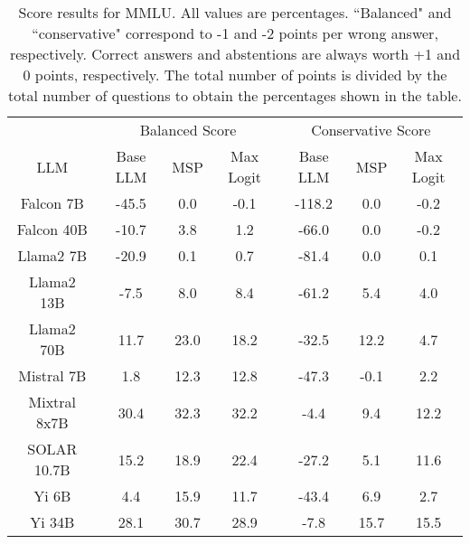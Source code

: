 \begin{table*}
\centering
\begin{tabular}{c|c|c|c|c|c|c}
& \multicolumn{3}{c|}{Balanced Score} & \multicolumn{3}{c}{Conservative Score} \\ 
LLM & Base LLM & MSP & Max Logit & Base LLM & MSP & Max Logit\\ \hline
Falcon 7B & -45.5 & 0.0 & -0.1 & -118.2 & 0.0 & -0.2\\
Falcon 40B & -10.7 & 3.8 & 1.2 & -66.0 & 0.0 & -0.2\\
Llama2 7B & -20.9 & 0.1 & 0.7 & -81.4 & 0.0 & 0.1\\
Llama2 13B & -7.5 & 8.0 & 8.4 & -61.2 & 5.4 & 4.0\\
Llama2 70B & 11.7 & 23.0 & 18.2 & -32.5 & 12.2 & 4.7\\
Mistral 7B & 1.8 & 12.3 & 12.8 & -47.3 & -0.1 & 2.2\\
Mixtral 8x7B & 30.4 & 32.3 & 32.2 & -4.4 & 9.4 & 12.2\\
SOLAR 10.7B & 15.2 & 18.9 & 22.4 & -27.2 & 5.1 & 11.6\\
Yi 6B & 4.4 & 15.9 & 11.7 & -43.4 & 6.9 & 2.7\\
Yi 34B & 28.1 & 30.7 & 28.9 & -7.8 & 15.7 & 15.5\\
\hline
\end{tabular}
\caption{Score results for MMLU. All values are percentages. ``Balanced" and ``conservative" correspond to -1 and -2 points per wrong answer, respectively. Correct answers and abstentions are always worth +1 and 0 points, respectively. The total number of points is divided by the total number of questions to obtain the percentages shown in the table.}
\label{tab:mmlu_score}
\end{table*}
